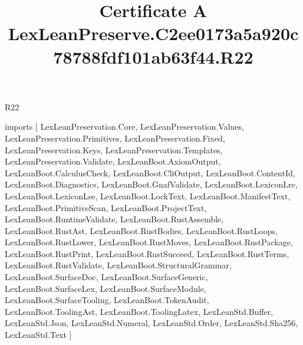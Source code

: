 \begin{lexlean}{R22}
\title{Certificate A LexLeanPreserve.C2ee0173a5a920c78788fdf101ab63f44.R22}
\begin{coremodule}
imports [
  LexLeanPreservation.Core,
  LexLeanPreservation.Values,
  LexLeanPreservation.Primitives,
  LexLeanPreservation.Fixed,
  LexLeanPreservation.Keys,
  LexLeanPreservation.Templates,
  LexLeanPreservation.Validate,
  LexLeanBoot.AxiomOutput,
  LexLeanBoot.CalculusCheck,
  LexLeanBoot.CliOutput,
  LexLeanBoot.ContentId,
  LexLeanBoot.Diagnostics,
  LexLeanBoot.GnafValidate,
  LexLeanBoot.LexiconLre,
  LexLeanBoot.LexiconLse,
  LexLeanBoot.LockText,
  LexLeanBoot.ManifestText,
  LexLeanBoot.PrimitiveScan,
  LexLeanBoot.ProjectText,
  LexLeanBoot.RuntimeValidate,
  LexLeanBoot.RustAssemble,
  LexLeanBoot.RustAst,
  LexLeanBoot.RustBodies,
  LexLeanBoot.RustLoops,
  LexLeanBoot.RustLower,
  LexLeanBoot.RustMoves,
  LexLeanBoot.RustPackage,
  LexLeanBoot.RustPrint,
  LexLeanBoot.RustSucceed,
  LexLeanBoot.RustTerms,
  LexLeanBoot.RustValidate,
  LexLeanBoot.StructuralGrammar,
  LexLeanBoot.SurfaceDoc,
  LexLeanBoot.SurfaceGeneric,
  LexLeanBoot.SurfaceLex,
  LexLeanBoot.SurfaceModule,
  LexLeanBoot.SurfaceTooling,
  LexLeanBoot.TokenAudit,
  LexLeanBoot.ToolingAst,
  LexLeanBoot.ToolingLatex,
  LexLeanStd.Buffer,
  LexLeanStd.Json,
  LexLeanStd.Numeral,
  LexLeanStd.Order,
  LexLeanStd.Sha256,
  LexLeanStd.Text
]


\end{coremodule}
\end{lexlean}

